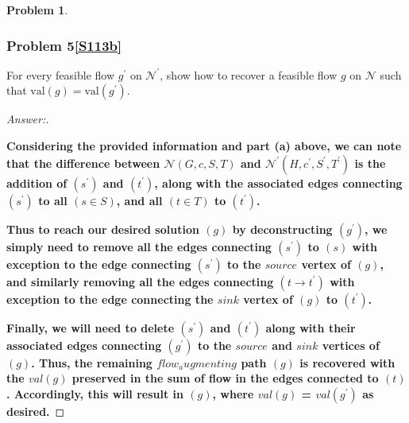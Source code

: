 \documentclass[11pt]{article}
\theoremstyle{definition}
\theoremstyle{definition}
\newtheorem{required}{Problem}
\theoremstyle{definition}
\begin{document}
\begin{required}
\begin{enumerate}[label=(\alph*)]
\newpage
\subsubsection{Problem 5\ref{S113b}}
\item \label{S113b} For every feasible flow $g^\prime$ on $\mathcal{N}^{\prime}$, show how to recover a feasible flow $g$ on $\mathcal{N}$ such that $\text{val}(g) = \text{val}(g^{\prime})$. 

\begin{proof}[Answer:] \
\item \textbf{Considering the provided information and part (a) above, we can note that the difference between $\mathcal{N}(G, c, S, T)$ and $\mathcal{N}^{\prime}(H, c^{\prime}, S^{\prime}, T^{\prime})$ is the addition of $(s^{\prime})$ and $(t^{\prime})$, along with the associated edges connecting $(s^{\prime})$ to all $(s \in S)$, and all $(t \in T)$ to $(t^{\prime})$.} \\
\item \textbf{Thus to reach our desired solution $(g)$ by deconstructing $(g^{\prime})$, we simply need to remove all the edges connecting $(s^{\prime})$ to $(s)$ with exception to the edge connecting $(s^{\prime})$ to the $source$ vertex of $(g)$, and similarly removing all the edges connecting $(t \to t^{\prime})$ with exception to the edge connecting the $sink$ vertex of $(g)$ to $(t^{\prime})$.}
\item \textbf{Finally, we will need to delete $(s^{\prime})$ and $(t^{\prime})$ along with their associated edges connecting $(g^{\prime})$ to the $source$ and $sink$ vertices of $(g)$. Thus, the remaining $flow_augmenting$ path $(g)$ is recovered with the $val(g)$ preserved in the sum of flow in the edges connected to $(t)$. Accordingly, this will result in $(g)$, where $val(g)$ = $val(g^{\prime})$ as desired.}
\end{proof}
\end{enumerate}
\end{required}




\newpage
\end{document}
